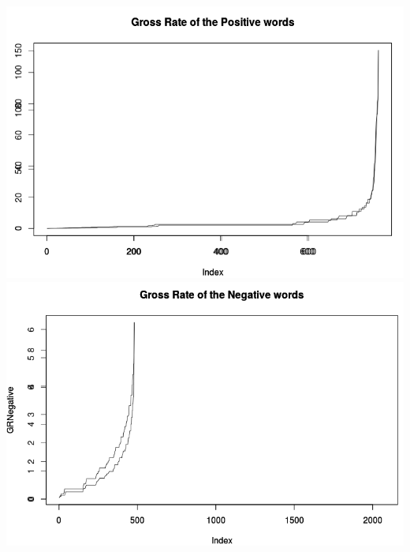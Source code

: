 \documentclass{article}
\begin{document}
\includegraphics[width=0.7\linewidth]{vis_GR_pos.png}\includegraphics[width=0.7\linewidth]{vis_GR_neg.png}\\
\end{document}
